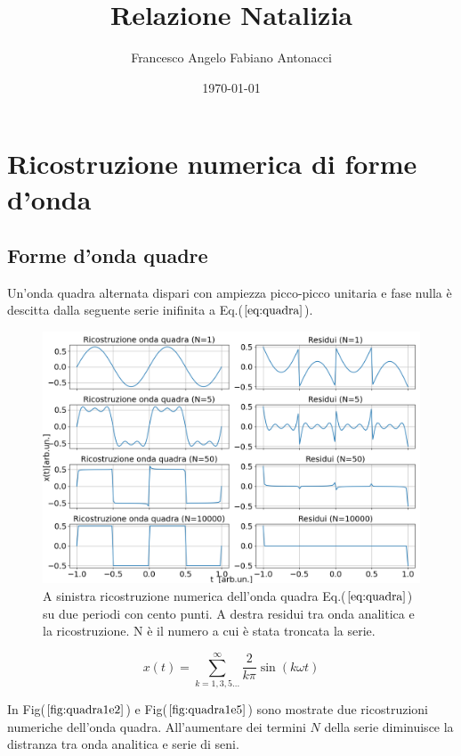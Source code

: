 \documentclass{article}
\author{Francesco Angelo Fabiano Antonacci}
\date{\today}
\title{Relazione Natalizia}
\begin{document}
\maketitle
\section{Ricostruzione numerica di forme d'onda}
    \subsection{Forme d'onda quadre}
    \label{sez:quadra}
        Un'onda quadra alternata dispari con ampiezza picco-picco unitaria e fase nulla è descitta dalla
        seguente serie inifinita a Eq.($\ref{eq:quadra}$).


        \begin{figure}[H]
            \centering
            \includegraphics[width=1.2\textwidth]{fousquarewave1e2.png} %
            \caption{A sinistra ricostruzione numerica dell'onda quadra Eq.($\ref{eq:quadra}$) su
                    due periodi con cento punti.
                    A destra residui tra onda analitica e la ricostruzione.
                    N è il numero a cui è stata troncata la serie.}
            \label{fig:quadra1e2}
        \end{figure}

        \begin{equation}
            x(t) = \sum_{k=1,3,5...}^{\infty} \frac{2}{k\pi}\sin\left(k\omega t\right)
            \label{eq:quadra}
        \end{equation}

        In Fig($\ref{fig:quadra1e2}$) e Fig($\ref{fig:quadra1e5}$) sono mostrate due ricostruzioni
        numeriche dell'onda quadra.
        All'aumentare dei termini $N$ della serie diminuisce la distranza tra onda analitica e serie 
        di seni.
\end{document}
